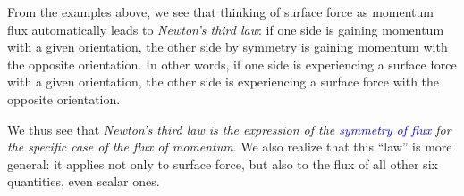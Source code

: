 \documentclass[a4paper,12pt,%
onecolumn,oneside,%
british%
]{memoir}
\newcommand{\langnohyph}[1]{\begin{hyphenrules}{nohyphenation}#1\end{hyphenrules}}
\newcommand*{\amp}{\&}
\renewcommand*{\|}[1][]{\nonscript\:#1\vert\nonscript\:\mathopen{}}
\newcommand*{\sect}{\S}%
\renewcommand*{\autoref}[2]{\sidepar{\vspace{-1ex}\footnotesize{\color{blue}\faIcon{%
angle-right%
}\enskip\sect~\ref{#1} page~\pageref{#1}}}\textcolor{blue}{#2}}
\begin{document}
%
%
From the examples above, we see that thinking of surface force as momentum flux automatically leads to \emph{Newton's third law}: if one side is gaining momentum with a given orientation, the other side by symmetry is gaining momentum with the opposite orientation. In other words, if one side is experiencing a surface force with a given orientation, the other side is experiencing a surface force with the opposite orientation.

We thus see that \emph{Newton's third law is the expression of the \autoref{def:symmetryflux}{symmetry of flux} for the specific case of the flux of momentum}. We also realize that this \enquote{law} is more general: it applies not only to surface force, but also to the flux of all other six quantities, even scalar ones.

% 
\end{document}
